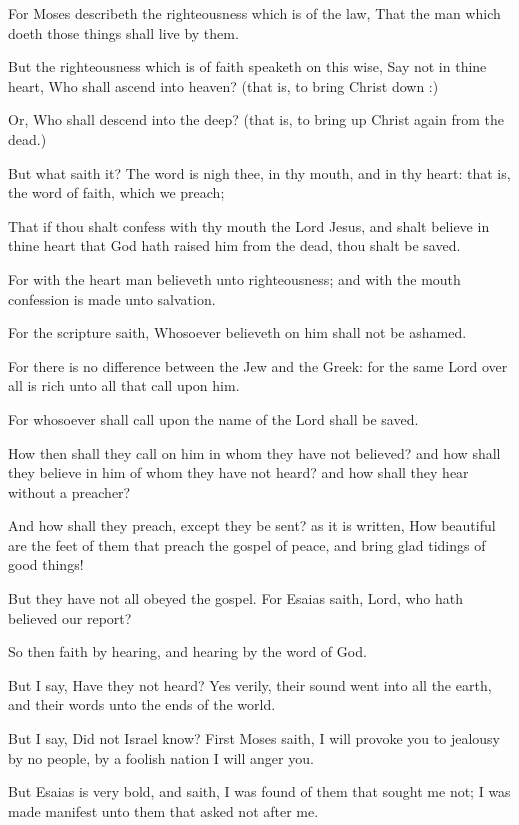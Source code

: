 {For
Moses
describeth the
righteousness which
is
of the
law,
That the
man which
doeth those
things shall
live
by
them.

But the
righteousness which is
of
faith
speaketh on this
wise,
Say
not
in
thine
heart,
Who shall
ascend
into
heaven? (that
is, to
bring
Christ
down
{}:)

Or,
Who shall
descend
into the
deep? (that
is, to bring
up
Christ
again
from the
dead.)

But
what saith
it? The
word
is
nigh
thee,
{}
in
thy
mouth,
and
in
thy
heart:
that
is, the
word of
faith,
which we
preach;

That
if thou shalt
confess
with
thy
mouth the
Lord
Jesus,
and shalt
believe
in
thine
heart
that
God hath
raised
him
from the
dead, thou shalt be
saved.

For with the
heart man
believeth
unto
righteousness;
and with the
mouth confession is
made
unto
salvation.

For the
scripture
saith,
Whosoever
believeth
on
him
shall
not be
ashamed.

For there
is
no
difference
between the
Jew
and the
Greek:
for
the
same
Lord over
all is
rich
unto
all that call
upon
him.

For
whosoever shall call
upon the
name of the
Lord shall be
saved.

How
then shall they call on
him
in
whom they
have
not
believed?
and
how shall they
believe in him of
whom they
have
not
heard?
and
how shall they
hear
without a
preacher?

And
how shall they
preach,
except they be
sent?
as it is
written,
How
beautiful are the
feet of them that preach the
gospel of
peace, and bring glad
tidings of good
things!

But they
have
not
all
obeyed the
gospel.
For
Esaias
saith,
Lord,
who hath
believed
our
report?

So
then
faith
{}
by
hearing,
and
hearing
by the
word of
God.

But I
say, Have
they
not
heard? Yes
verily,
their
sound
went
into
all the
earth,
and
their
words
unto the
ends of the
world.

But I
say,
Did
not
Israel
know?
First
Moses
saith,
I will
provoke
you to
jealousy
by
{}
no
people,
{}
by a
foolish
nation I will
anger
you.

But
Esaias is very
bold,
and
saith, I was
found of
them that
sought
me
not; I was
made
manifest unto
them that
asked
not
after
me.

}
